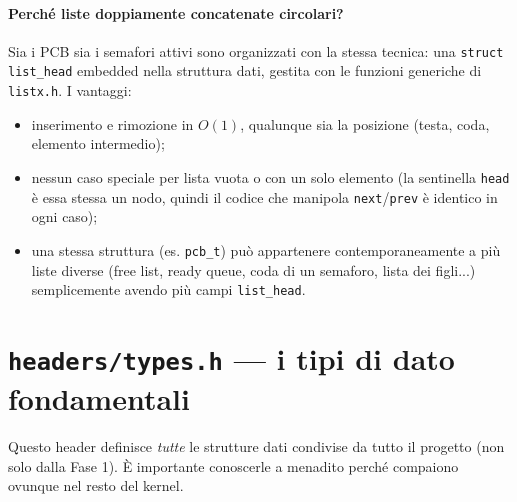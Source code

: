 \documentclass[11pt,a4paper]{article}
\newcommand{\code}[1]{\texttt{#1}}
\begin{document}
\paragraph{Perché liste doppiamente concatenate circolari?}
Sia i PCB sia i semafori attivi sono organizzati con la stessa tecnica: una
\code{struct list\_head} embedded nella struttura dati, gestita con le
funzioni generiche di \code{listx.h}. I vantaggi:
\begin{itemize}
\item inserimento e rimozione in $O(1)$, qualunque sia la posizione (testa,
  coda, elemento intermedio);
\item nessun caso speciale per lista vuota o con un solo elemento (la
  sentinella \code{head} è essa stessa un nodo, quindi il codice che
  manipola \code{next}/\code{prev} è identico in ogni caso);
\item una stessa struttura (es. \code{pcb\_t}) può appartenere
  contemporaneamente a più liste diverse (free list, ready queue, coda di un
  semaforo, lista dei figli...) semplicemente avendo più campi
  \code{list\_head}.
\end{itemize}

\section{\code{headers/types.h} --- i tipi di dato fondamentali}

Questo header definisce \emph{tutte} le strutture dati condivise da tutto il
progetto (non solo dalla Fase 1). È importante conoscerle a menadito perché
compaiono ovunque nel resto del kernel.
\end{document}
